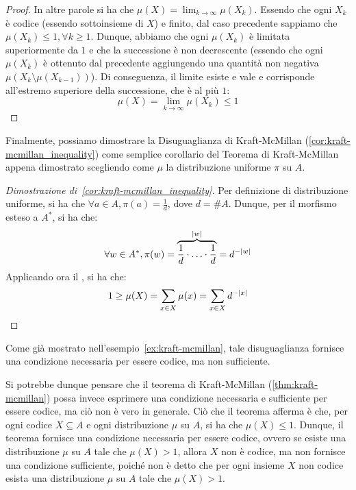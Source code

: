 \begin{proof}
  In altre parole si ha che \(\mu(X) = \lim_{k \to \infty} \mu(X_k)\). Essendo che ogni \(X_k\) è codice (essendo sottoinsieme di \(X\)) e finito, dal caso precedente sappiamo che \(\mu(X_k) \leq 1, \forall k \geq 1\).
  Dunque, abbiamo che ogni \(\mu(X_k)\) è limitata superiormente da \(1\) e che la successione è non decrescente (essendo che ogni \(\mu(X_k)\) è ottenuto dal precedente aggiungendo una quantità non negativa \(\mu(X_{k}\setminus\mu(X_{k-1}))\)). 
  Di conseguenza, il limite esiste e vale e corrisponde all'estremo superiore della successione, che è al più \(1\):
  \[\mu(X) = \lim_{k \to \infty} \mu(X_k) \leq 1\]
\end{proof}

Finalmente, possiamo dimostrare la Disuguaglianza di Kraft-McMillan (\ref{cor:kraft-mcmillan_inequality}) come semplice corollario del Teorema di Kraft-McMillan appena dimostrato scegliendo come \(\mu\) la distribuzione uniforme \(\pi\) su \(A\).

\begin{proof}[Dimostrazione di~\ref{cor:kraft-mcmillan_inequality}]
  Per definizione di distribuzione uniforme, si ha che \(\forall a \in A, \pi(a) = \frac{1}{d}\), dove \(d = \# A\).
  Dunque, per il morfismo esteso a \(A^*\), si ha che:
  \begin{equation*}
    \forall w \in A^*, \pi(w) = \overbrace{\frac{1}{d}\cdot\ldots\cdot\frac{1}{d}}^{\left|w\right|} = d^{-\lvert w\rvert}
  \end{equation*}
  Applicando ora il , si ha che:
  \[1 \geq\mu(X) = \sum_{x \in X} \mu(x) = \sum_{x \in X} d^{-\left|x\right|}\]
\end{proof}

Come già mostrato nell'esempio~\ref{ex:kraft-mcmillan}, tale disuguaglianza fornisce una condizione necessaria per essere codice, ma non sufficiente.

Si potrebbe dunque pensare che il teorema di Kraft-McMillan (\ref{thm:kraft-mcmillan}) possa invece esprimere una condizione necessaria e sufficiente per essere codice, ma ciò non è vero in generale.
Ciò che il teorema afferma è che, per ogni codice \(X \subseteq A\) e ogni distribuzione \(\mu\) su \(A\), si ha che \(\mu(X) \leq 1\).
Dunque, il teorema fornisce una condizione necessaria per essere codice, ovvero se esiste una distribuzione \(\mu\) su \(A\) tale che \(\mu(X) > 1\), allora \(X\) non è codice, ma non fornisce una condizione sufficiente, poiché non è detto che per ogni insieme \(X\) non codice esista una distribuzione \(\mu\) su \(A\) tale che \(\mu(X) > 1\).

